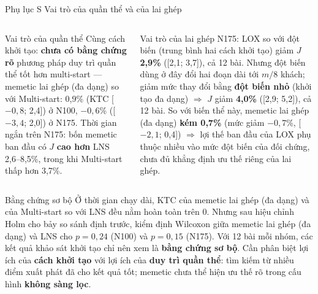\documentclass[aspectratio=169,10pt,t,xcolor={table}]{beamer}
\newcommand{\mth}[1]{\textsf{#1}}
\newcommand{\msd}{\mth{Multi-start}}
\newcommand{\lns}{\mth{LNS}}
\newcommand{\apptitle}[2]{Phụ lục #1 \textperiodcentered{} #2}
\begin{document}
\begin{frame}{\apptitle{S}{Vai trò của quần thể và của lai ghép}}
\begin{columns}[T,onlytextwidth]
\begin{block}{Vai trò của quần thể}
\scriptsize Cùng cách khởi tạo: \textbf{chưa có bằng chứng rõ} phương pháp duy trì quần thể tốt hơn multi-start --- memetic lai ghép (đa dạng) so với \msd{}: 0,9\% (KTC [$-0{,}8$; 2,4]) ở N100, $-0{,}6$\% ([$-3{,}4$; 2,0]) ở N175. Thời gian ngắn trên N175: bốn memetic ban đầu có $J$ \textbf{cao hơn} \lns{} 2,6--8,5\%, trong khi \msd{} thấp hơn 3,7\%.
\end{block}
\begin{block}{Vai trò của lai ghép}
\scriptsize N175: LOX so với đột biến (trung bình hai cách khởi tạo) giảm $J$ \textbf{2,9\%} ([2,1; 3,7]), cả 12 bài. Nhưng đột biến dùng ở đây đổi hai đoạn dài tới $m/8$ khách; giảm mức thay đổi bằng \textbf{đột biến nhỏ} (khởi tạo đa dạng) $\Rightarrow$ $J$ giảm \textbf{4,0\%} ([2,9; 5,2]), cả 12 bài. So với biến thể này, memetic lai ghép (đa dạng) \textbf{kém 0,7\%} (mức giảm $-0{,}7$\%, [$-2{,}1$; 0,4]) $\Rightarrow$ lợi thế ban đầu của LOX phụ thuộc nhiều vào mức đột biến của đối chứng, chưa đủ khẳng định ưu thế riêng của lai ghép.
\end{block}
\end{columns}
\vspace{4pt}
\begin{alertblock}{Bằng chứng sơ bộ}
\scriptsize Ở thời gian chạy dài, KTC của memetic lai ghép (đa dạng) và của \msd{} so với \lns{} đều nằm hoàn toàn trên 0. Nhưng sau hiệu chỉnh Holm cho bảy so sánh định trước, kiểm định Wilcoxon giữa memetic lai ghép (đa dạng) và \lns{} cho $p=0{,}24$ (N100) và $p=0{,}15$ (N175). Với 12 bài mỗi nhóm, các kết quả khảo sát khởi tạo chỉ nên xem là \textbf{bằng chứng sơ bộ}. Cần phân biệt lợi ích của \textbf{cách khởi tạo} với lợi ích của \textbf{duy trì quần thể}: tìm kiếm từ nhiều điểm xuất phát đã cho kết quả tốt; memetic chưa thể hiện ưu thế rõ trong cấu hình \textbf{không sàng lọc}.
\end{alertblock}
\end{frame}
\end{document}
